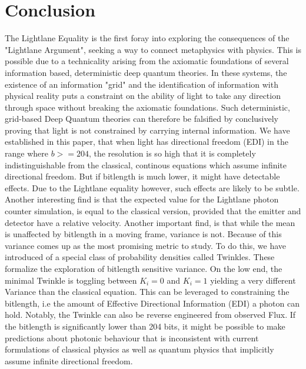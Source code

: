 \documentclass[notitlepage]{article}
\begin{document}
\section{Conclusion}
The Lightlane Equality is the first foray into exploring the consequences of the "Lightlane Argument", seeking a way to connect metaphysics with physics. This is possible due to a technicality arising from the axiomatic foundations of several information based, deterministic deep quantum theories. In these systems, the existence of an information "grid" and the identification of information with physical reality puts a constraint on the ability of light to take any direction through space without breaking the axiomatic foundations. Such deterministic, grid-based Deep Quantum theories can therefore be falsified by conclusively proving that light is not  constrained by carrying internal information. 
We have established in this paper, that when light has directional freedom (EDI) in the range where $b >= 204$,  the resolution is so high that it is completely indistinguishable from the classical, continous equations which assume infinite directional freedom. But if bitlength is much lower, it might have detectable effects. Due to the Lightlane equality however, such effects are likely to be subtle.
Another interesting find is that the expected value for the Lightlane photon counter simulation, is equal to the classical version, provided that the emitter and detector have a relative velocity. Another important find, is that while the mean is unaffected by bitlength in a moving frame, variance is not.
Because of this variance comes up as the most promising metric to study. To do this, we have introduced of a special class of probability densities called Twinkles. These formalize the exploration of bitlength sensitive variance.  On the low end, the minimal Twinkle is toggling between $K_i = 0$ and $K_i = 1$ yielding a very different Variance than the classical equation. This can be leveraged to constraining the bitlength, i.e the amount of Effective Directional Information (EDI) a photon can hold. Notably, the Twinkle can also be reverse engineered from observed Flux. If the bitlength is significantly lower than 204 bits, it might be possible to make predictions about photonic behaviour that is inconsistent with current formulations of classical physics as well as quantum physics that implicitly assume infinite directional freedom.


	










\end{document}
